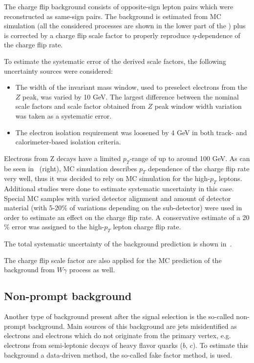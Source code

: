 The charge flip background consists of opposite-sign lepton pairs which were reconstructed as same-sign pairs.
The background is estimated from MC simulation (all the considered processes are shown in the lower part of the ) 
plus is corrected by a charge flip scale factor to properly reproduce $\eta$-dependence of the charge flip rate.

To estimate the systematic error of the derived scale factors, the following uncertainty sources were considered:
\begin{itemize}
 \item The width of the invariant mass window, used to preselect electrons from the $Z$ peak, was varied by 10 GeV.
 The largest difference between the nominal scale factors and scale factor obtained from $Z$ peak window width variation was taken as a systematic error.
 \item The electron isolation requirement was loosened by 4 GeV in both track- and calorimeter-based isolation criteria.
\end{itemize}
Electrons from Z decays have a limited $p_T$-range of up to around 100 GeV. As can be seen in~ (right), 
MC simulation describes $p_T$ dependence of the charge flip rate very well, thus it was decided to rely on MC simulation 
for the high-$p_T$ leptons. Additional studies were done to estimate systematic uncertainty in this case.
Special MC samples with varied detector alignment and amount of detector material (with 5-20$\%$ of variations depending on the sub-detector) 
were used in order to estimate an effect on the charge flip rate.
A conservative estimate of a 20$\%$ error was assigned to the high-$p_T$ lepton charge flip rate.

The total systematic uncertainty of the background prediction is shown in~.

The charge flip scale factor are also applied for the MC prediction of the background from $W\gamma$ process as well.

\subsection{Non-prompt background}
\label{subsec:fakes_description}
Another type of background present after the signal selection is the so-called non-prompt background.
Main sources of this background are jets misidentified as electrons and electrons which do not originate from 
the primary vertex, e.g. electrons from semi-leptonic decays of heavy flavor quarks ($b$, $c$).
To estimate this background a data-driven method, the so-called fake factor method, is used.

